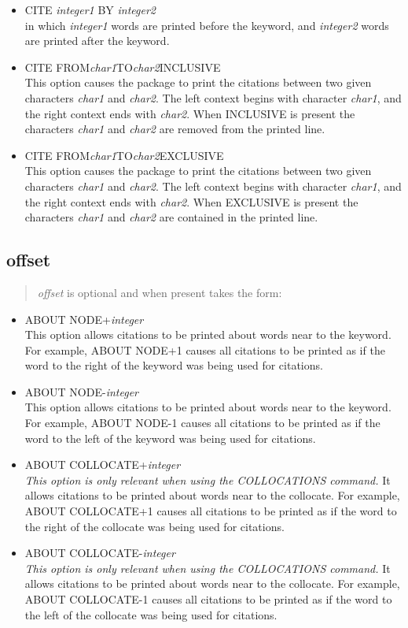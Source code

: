 \begin{itemize}
\item  CITE {\em integer1} BY {\em integer2}\\
    in which {\em integer1} words are printed before the keyword, and
    {\em integer2} words are printed after the keyword.
\item  CITE FROM{\em char1}TO{\em char2}INCLUSIVE\\
    This option causes the package to print the citations between two
    given characters {\em char1} and {\em char2}.  The left context begins with
    character {\em char1}, and the right context ends with {\em char2}.
    When INCLUSIVE is present the characters {\em char1} and {\em char2} are
    removed from the printed line.
\item  CITE FROM{\em char1}TO{\em char2}EXCLUSIVE\\
    This option causes the package to print the citations between two
    given characters {\em char1} and {\em char2}.  The left context begins with
    character {\em char1}, and the right context ends with {\em char2}.
    When EXCLUSIVE is present the characters {\em char1} and {\em char2} are
    contained in the printed line.
\end{itemize}

\subsection{offset}
\label{offset}
\begin{quote}
{\em offset} is optional and when present takes the form:
\end{quote}

\begin{itemize}
\item ABOUT NODE+{\em integer}\\
    This option allows citations to be printed about words near to the keyword.
    For example, ABOUT NODE+1 causes all citations to be printed as if the word
    to the right of the keyword was being used for citations.
\item ABOUT NODE-{\em integer}\\
    This option allows citations to be printed about words near to the keyword.
    For example, ABOUT NODE-1 causes all citations to be printed as if the word
    to the left of the keyword was being used for citations.
\item ABOUT COLLOCATE+{\em integer}\\
    {\em This option is only relevant when using the COLLOCATIONS command.}
    It allows citations to be printed about words near to the collocate.
    For example, ABOUT COLLOCATE+1 causes all citations to be printed as if
    the word to the right of the collocate was being used for citations.
\item ABOUT COLLOCATE-{\em integer}\\
    {\em This option is only relevant when using the COLLOCATIONS command.}
    It allows citations to be printed about words near to the collocate.
    For example, ABOUT COLLOCATE-1 causes all citations to be printed as if
    the word to the left of the collocate was being used for citations.
\end{itemize}

